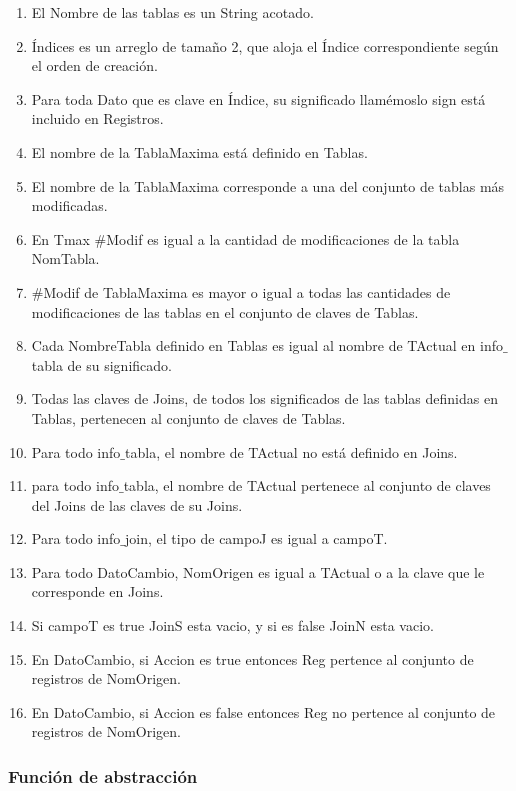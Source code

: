 \begin{enumerate}
  \item El Nombre de las tablas es un String acotado.
  \item Índices es un arreglo de tamaño 2, que aloja el Índice correspondiente según el orden de creación.
  \item Para toda Dato que es clave en Índice, su significado llamémoslo sign está incluido en Registros.
  \item El nombre de la TablaMaxima está definido en Tablas.
  \item El nombre de la TablaMaxima corresponde a una del conjunto de tablas más modificadas.
  \item En Tmax $\#$Modif es igual a la cantidad de modificaciones de la tabla NomTabla.
  \item $\#$Modif de TablaMaxima es mayor o igual a todas las cantidades de modificaciones de las tablas en el conjunto de claves de Tablas.
  \item Cada NombreTabla definido en Tablas es igual al nombre de TActual en info$\_$tabla de su significado.
  \item Todas las claves de Joins, de todos los significados de las tablas definidas en Tablas, pertenecen al conjunto de claves de Tablas.
  \item Para todo info$\_$tabla, el nombre de TActual no está definido en Joins.
  \item para todo info$\_$tabla, el nombre de TActual pertenece al conjunto de claves del Joins de las claves de su Joins.
  \item Para todo info$\_$join, el tipo de campoJ es igual a campoT.
  \item Para todo DatoCambio, NomOrigen es igual a TActual o a la clave que le corresponde en Joins.
  \item Si campoT es true JoinS esta vacio, y si es false JoinN esta vacio.
  \item En DatoCambio, si Accion es true entonces Reg pertence al conjunto de registros de NomOrigen.
  \item En DatoCambio, si Accion es false entonces Reg no pertence al conjunto de registros de NomOrigen.

\end{enumerate}


\subsubsection*{Función de abstracción}

